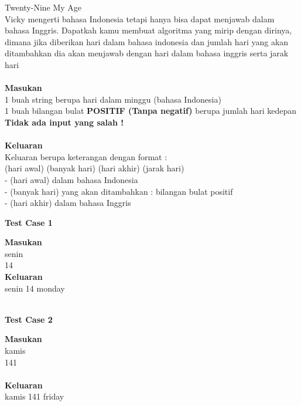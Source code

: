 \newpage
\begin{permasalahan}{Twenty-Nine My Age}\\
\label{prob:a29myage}
Vicky mengerti bahasa Indonesia tetapi hanya bisa dapat menjawab dalam bahasa Inggris. Dapatkah kamu membuat algoritma yang mirip dengan dirinya, dimana jika diberikan hari dalam bahasa indonesia dan jumlah hari yang akan ditambahkan dia akan menjawab dengan hari dalam bahasa inggris serta jarak hari\\\\
 
	\textbf{Masukan}\\
	1 buah string berupa hari dalam minggu (bahasa Indonesia)\\
	1 buah bilangan bulat \textbf{POSITIF (Tanpa negatif)} berupa jumlah hari kedepan \\
	\textbf{Tidak ada input yang salah !}\\\\
	\textbf{Keluaran}\\
	Keluaran berupa keterangan dengan format :\\
	(hari awal) (banyak hari) (hari akhir) (jarak hari)\\
	- (hari awal) dalam bahasa Indonesia\\
	- (banyak hari) yang akan ditambahkan : bilangan bulat positif\\
	- (hari akhir) dalam bahasa Inggris \\

	\begin{center}
	\textbf{Test Case 1}\\
	\end{center}
	\textbf{Masukan}\\
	senin \\
	14 \\
	\textbf{Keluaran}\\
	senin 14 monday\\\\
	
	\begin{center}
	\textbf{Test Case 2}\\
	\end{center}
	\textbf{Masukan}\\
	kamis \\
	141 \\\\
	\textbf{Keluaran}\\
	kamis 141 friday\\\\



\end{permasalahan}
